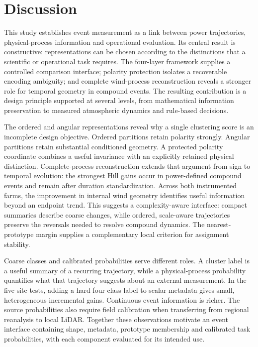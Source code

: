 \documentclass[preprint,12pt]{elsarticle}
\begin{document}
\FloatBarrier
\section{Discussion}\label{discussion}

This study establishes event measurement as a link between power trajectories, physical-process information and operational evaluation. Its central result is constructive: representations can be chosen according to the distinctions that a scientific or operational task requires. The four-layer framework supplies a controlled comparison interface; polarity protection isolates a recoverable encoding ambiguity; and complete wind-process reconstruction reveals a stronger role for temporal geometry in compound events. The resulting contribution is a design principle supported at several levels, from mathematical information preservation to measured atmospheric dynamics and rule-based decisions.

The ordered and angular representations reveal why a single clustering score is an incomplete design objective. Ordered partitions retain polarity strongly. Angular partitions retain substantial conditioned geometry. A protected polarity coordinate combines a useful invariance with an explicitly retained physical distinction. Complete-process reconstruction extends that argument from sign to temporal evolution: the strongest Hill gains occur in power-defined compound events and remain after duration standardization. Across both instrumented farms, the improvement in internal wind geometry identifies useful information beyond an endpoint trend. This suggests a complexity-aware interface: compact summaries describe coarse changes, while ordered, scale-aware trajectories preserve the reversals needed to resolve compound dynamics. The nearest-prototype margin supplies a complementary local criterion for assignment stability.

Coarse classes and calibrated probabilities serve different roles. A cluster label is a useful summary of a recurring trajectory, while a physical-process probability quantifies what that trajectory suggests about an external measurement. In the five-site tests, adding a hard four-class label to scalar metadata gives small, heterogeneous incremental gains. Continuous event information is richer. The source probabilities also require field calibration when transferring from regional reanalysis to local LiDAR. Together these observations motivate an event interface containing shape, metadata, prototype membership and calibrated task probabilities, with each component evaluated for its intended use.
\end{document}
